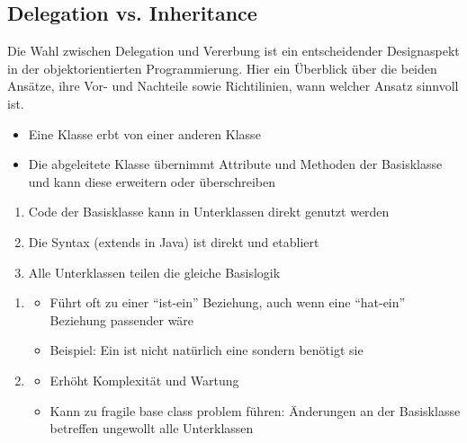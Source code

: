\subsection{Delegation vs. Inheritance}
\begin{infoBox}[title=Delegation vs. Vererbung]
    Die Wahl zwischen Delegation und Vererbung ist ein entscheidender Designaspekt in der objektorientierten Programmierung. Hier ein Überblick über die beiden Ansätze, ihre Vor- und Nachteile sowie Richtilinien, wann welcher Ansatz sinnvoll ist.
\end{infoBox}
\begin{infoBox}[title=Vererbung]
    \begin{itemize}
        \item Eine Klasse erbt von einer anderen Klasse
        \item Die abgeleitete Klasse übernimmt Attribute und Methoden der Basisklasse und kann diese erweitern oder überschreiben
    \end{itemize}
    \begin{enumerate}
        \item {} Code der Basisklasse kann in Unterklassen direkt genutzt werden
        \item {} Die Syntax (extends in Java) ist direkt und etabliert
        \item {} Alle Unterklassen teilen die gleiche Basislogik
    \end{enumerate}
    \begin{enumerate}
        \item {}
        \begin{itemize}
            \item Führt oft zu einer \enquote{ist-ein} Beziehung, auch wenn eine \enquote{hat-ein} Beziehung passender wäre
            \item Beispiel: Ein  ist nicht natürlich eine  sondern benötigt sie
        \end{itemize}
        \item {}
        \begin{itemize}
            \item Erhöht Komplexität und Wartung
            \item Kann zu fragile base class problem führen: Änderungen an der Basisklasse betreffen ungewollt alle Unterklassen

\end{itemize}
\end{enumerate}
\end{infoBox}
